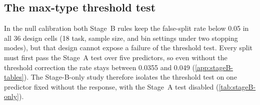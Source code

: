 \subsection{The max-type threshold test}
\label{sec:results-stageB}

In the null calibration both Stage~B rules keep the false-split rate below
0.05 in all 36 design cells (18 task, sample size, and bin settings under two
stopping modes), but that design cannot expose a failure of the
threshold test. Every split must first pass the Stage~A test over five
predictors, so even without the threshold correction the rate stays between
0.0355 and 0.049 (\cref{app:stageB-tables}). The Stage-B-only study therefore
isolates the threshold test on one predictor fixed without the response, with
the Stage~A test disabled (\cref{tab:stageB-only}).

